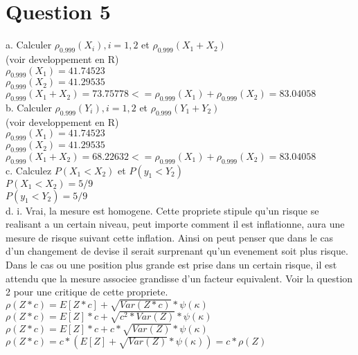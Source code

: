 \section{Question 5}

a. Calculer $\rho_{0.999}(X_i), i=1,2 $ et $\rho_{0.999}(X_1+X_2) $ \\
(voir developpement en R)\\

$ \rho_{0.999}(X_1) = 41.74523 $\\
$ \rho_{0.999}(X_2) =  41.29535 $\\
$ \rho_{0.999}(X_1 + X_2) =  73.75778 <= \rho_{0.999}(X_1) + \rho_{0.999}(X_2) = 83.04058$ \\


b. Calculer $\rho_{0.999}(Y_i), i=1,2 $ et $\rho_{0.999}(Y_1+Y_2) $ \\
(voir developpement en R)\\

$ \rho_{0.999}(X_1) = 41.74523 $\\
$ \rho_{0.999}(X_2) =  41.29535 $\\
$ \rho_{0.999}(X_1 + X_2) =  68.22632 <= \rho_{0.999}(X_1) + \rho_{0.999}(X_2) = 83.04058$ \\

c. Calculez $P(X_1 < X_2)$ et $P(y_1 < Y_2)$ \\
$P(X_1 < X_2) = 5/9$\\  
$P(y_1 < Y_2) = 5/9$\\

d. i. Vrai, la mesure est homogene. Cette propriete stipule qu'un risque se realisant a un certain niveau, peut importe comment il est inflationne, aura une mesure de risque suivant cette inflation. Ainsi on peut penser que dans le cas d'un changement de devise il serait surprenant qu'un evenement soit plus risque. Dans le cas ou une position plus grande est prise dans un certain risque, il est attendu que la mesure associee grandisse d'un facteur equivalent. Voir la question 2 pour une critique de cette propriete.\\

$\rho(Z*c) = E[Z*c] + \sqrt{Var(Z*c)} * \psi(\kappa)$\\
$\rho(Z*c) = E[Z]*c + \sqrt{c^2*Var(Z)} * \psi(\kappa)$\\
$\rho(Z*c) = E[Z]*c + c*\sqrt{Var(Z)} * \psi(\kappa)$\\
$\rho(Z*c) = c * (E[Z] + \sqrt{Var(Z)} * \psi(\kappa)) = c*\rho(Z)$\\

